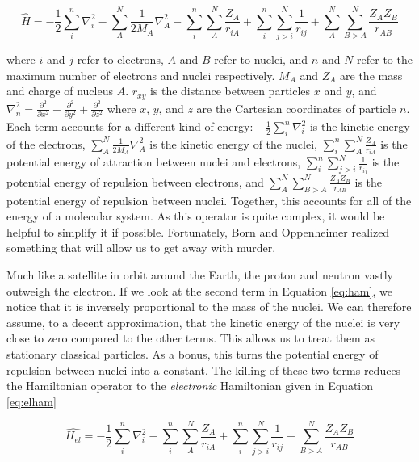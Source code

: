 \documentclass[12pt]{report}
\begin{document}
\begin{equation}
\label{eq:ham}
\hat{H} = -\frac{1}{2}\sum^{n}_{i}\nabla^{2}_{i} - \sum^{N}_{A}\frac{1}{2M_{A}}\nabla^{2}_{A} - \sum^{n}_{i}\sum^{N}_{A}\frac{Z_{A}}{r_{iA}}
+ \sum^{n}_{i}\sum^{N}_{j>i}\frac{1}{r_{ij}} + \sum^{N}_{A}\sum^{N}_{B>A}\frac{Z_{A}Z_{B}}{r_{AB}}
\end{equation} 

where $i$ and $j$ refer to electrons, $A$ and $B$ refer to nuclei, and $n$ and $N$ refer to the maximum number of electrons and nuclei respectively. $M_{A}$ and $Z_{A}$ are the mass and charge of nucleus $A$. $r_{xy}$ is the distance between particles $x$ and $y$, and $\nabla^{2}_{n}=\frac{\partial^{2}}{\partial x^{2}}+\frac{\partial^{2}}{\partial y^{2}}+\frac{\partial^{2}}{\partial z^{2}}$ where $x$, $y$, and $z$ are the Cartesian coordinates of particle $n$. Each term accounts for a different kind of energy: $-\frac{1}{2}\sum^{n}_{i}\nabla^{2}_{i}$ is the kinetic energy of the electrons, $\sum^{N}_{A}\frac{1}{2M_{A}}\nabla^{2}_{A}$ is the kinetic energy of the nuclei, $\sum^{n}_{i}\sum^{N}_{A}\frac{Z_{A}}{r_{iA}}$ is the potential energy of attraction between nuclei and electrons, $\sum^{n}_{i}\sum^{N}_{j>i}\frac{1}{r_{ij}} $ is the potential energy of repulsion between electrons, and $\sum^{N}_{A}\sum^{N}_{B>A}\frac{Z_{A}Z_{B}}{r_{AB}}$ is the potential energy of repulsion between nuclei. Together, this accounts for all of the energy of a molecular system. As this operator is quite complex, it would be helpful to simplify it if possible. Fortunately, Born and Oppenheimer\cite{1927AnP...389..457B} realized something that will allow us to get away with murder.

Much like a satellite in orbit around the Earth, the proton and neutron vastly outweigh the electron. If we look at the second term in Equation \ref{eq:ham}, we notice that it is inversely proportional to the mass of the nuclei. We can therefore assume, to a decent approximation, that the kinetic energy of the nuclei is very close to zero compared to the other terms. This allows us to treat them as stationary classical particles. As a bonus, this turns the potential energy of repulsion between nuclei into a constant. The killing of these two terms reduces the Hamiltonian operator to the \textit{electronic} Hamiltonian given in Equation \ref{eq:elham}

\begin{equation}
\label{eq:elham}
\hat{H_{el}} = -\frac{1}{2}\sum^{n}_{i}\nabla^{2}_{i}  - \sum^{n}_{i}\sum^{N}_{A}\frac{Z_{A}}{r_{iA}} + \sum^{n}_{i}\sum^{N}_{j>i}\frac{1}{r_{ij}} + \sum^{N}_{B>A}\frac{Z_{A}Z_{B}}{r_{AB}}
\end{equation} 
\end{document}
